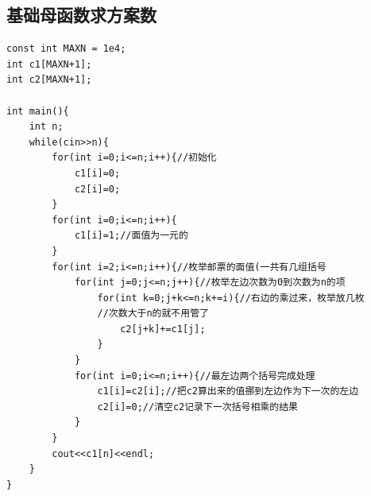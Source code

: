 \documentclass[a4]{ctexart}
\begin{document}
\subsection{基础母函数求方案数}
\begin{lstlisting}
const int MAXN = 1e4;
int c1[MAXN+1];
int c2[MAXN+1];

int main(){
	int n;
	while(cin>>n){ 
		for(int i=0;i<=n;i++){//初始化 
			c1[i]=0;
			c2[i]=0;
		}
		for(int i=0;i<=n;i++){
			c1[i]=1;//面值为一元的
		}
		for(int i=2;i<=n;i++){//枚举邮票的面值(一共有几组括号 
			for(int j=0;j<=n;j++){//枚举左边次数为0到次数为n的项 
				for(int k=0;j+k<=n;k+=i){//右边的乘过来，枚举放几枚
				//次数大于n的就不用管了 
					c2[j+k]+=c1[j];
				}
			}
			for(int i=0;i<=n;i++){//最左边两个括号完成处理 
				c1[i]=c2[i];//把c2算出来的值挪到左边作为下一次的左边 
				c2[i]=0;//清空c2记录下一次括号相乘的结果 
			}
		}
		cout<<c1[n]<<endl; 
	} 
} 
\end{lstlisting}
\end{document}
